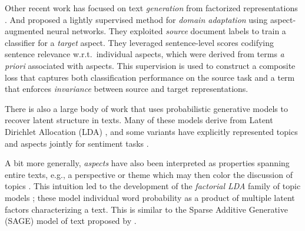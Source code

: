 \documentclass[11pt,a4paper]{article}
\begin{document}

Other recent work has focused on text \emph{generation} from factorized representations \cite{larsson2017disentangled}. And  proposed a lightly supervised method for \emph{domain adaptation} using aspect-augmented neural networks. They exploited \emph{source} document labels to train a classifier for a \emph{target} aspect. They leveraged sentence-level scores codifying sentence relevance w.r.t.~individual aspects, which were derived from terms \emph{a priori} associated with aspects. This supervision is used to construct a composite loss that captures both classification performance on the source task and a term that enforces \emph{invariance} between source and target representations.



There is also a large body of work that uses probabilistic generative models to recover latent structure in texts. Many of these models derive from Latent Dirichlet Allocation (LDA) \cite{blei2003latent}, and some variants have explicitly represented topics and aspects jointly for sentiment tasks \cite{brody2010unsupervised,sauper2010incorporating,sauper2011content,mukherjee2012aspect,sauper2013automatic,kim2013hierarchical}. 

A bit more generally, \emph{aspects} have also been interpreted as properties spanning entire texts, e.g., a perspective or theme which may then color the discussion of topics \cite{paul2010two}. This intuition led to the development of the \emph{factorial LDA} family of topic models \cite{paul2012factorial,wallace2014large}; these model individual word probability as a product of multiple latent factors characterizing a text. This is similar to the Sparse Additive Generative (SAGE) model of text proposed by .%
\end{document}
